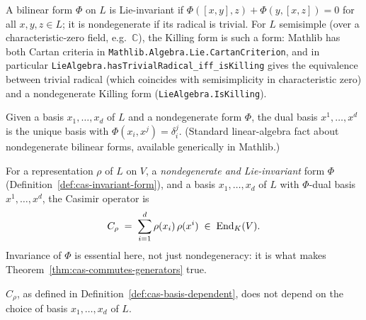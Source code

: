 \begin{definition}
  \label{def:cas-invariant-form}
  \mathlibok
  A bilinear form $\Phi$ on $L$ is Lie-invariant if $\Phi([x,y],z) +
  \Phi(y,[x,z]) = 0$ for all $x,y,z \in L$; it is nondegenerate if its
  radical is trivial. For $L$ semisimple (over a characteristic-zero field,
  e.g.\ $\mathbb{C}$), the Killing form is such a form: Mathlib has both
  Cartan criteria in \texttt{Mathlib.Algebra.Lie.CartanCriterion}, and in
  particular \texttt{LieAlgebra.hasTrivialRadical\_iff\_isKilling} gives the
  equivalence between trivial radical (which coincides with semisimplicity
  in characteristic zero) and a nondegenerate Killing form
  (\texttt{LieAlgebra.IsKilling}).
\end{definition}

\begin{definition}
  \label{def:cas-dual-basis}
  \mathlibok
  Given a basis $x_1, \dots, x_d$ of $L$ and a nondegenerate form $\Phi$, the
  dual basis $x^1, \dots, x^d$ is the unique basis with
  $\Phi(x_i, x^j) = \delta_i^j$. (Standard linear-algebra fact about
  nondegenerate bilinear forms, available generically in Mathlib.)
\end{definition}

\begin{definition}
  \label{def:cas-basis-dependent}
  \leanok
  For a representation $\rho$ of $L$ on $V$, a \emph{nondegenerate and
  Lie-invariant} form $\Phi$ (Definition~\ref{def:cas-invariant-form}), and a
  basis $x_1,\dots,x_d$ of $L$ with $\Phi$-dual basis $x^1,\dots,x^d$, the
  Casimir operator is
  \[
    C_\rho \;=\; \sum_{i=1}^d \rho(x_i)\,\rho(x^i) \;\in\; \operatorname{End}_K(V).
  \]
  Invariance of $\Phi$ is essential here, not just nondegeneracy: it is what
  makes Theorem~\ref{thm:cas-commutes-generators} true.
\end{definition}

\begin{theorem}
  \label{thm:cas-change-of-basis}
  \leanok
  $C_\rho$, as defined in Definition~\ref{def:cas-basis-dependent}, does not
  depend on the choice of basis $x_1,\dots,x_d$ of $L$.
\end{theorem}

